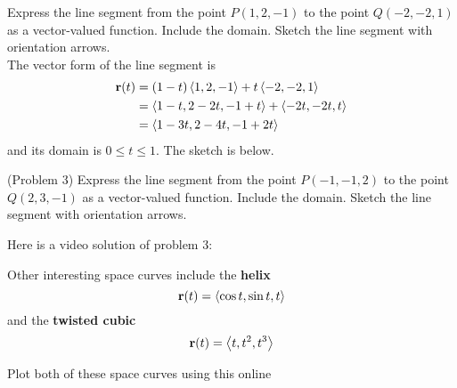 \documentclass[handout]{ximera}
\begin{document}
\begin{example}[Example 3]
Express the line segment from the point $P(1, 2, -1)$ to the point $Q(-2, -2, 1)$ as a vector-valued function.  
Include the domain. Sketch the line segment with orientation arrows.\\
The vector form of the line segment is
\begin{align*}
    \mathbf r(t) &= (1-t)\left\langle 1, 2, -1\right\rangle + t \left\langle -2, -2, 1\right\rangle\\
              &= \left\langle 1-t, 2-2t, -1+t\right\rangle + \left\langle -2t, -2t, t\right\rangle\\
              &= \left\langle 1-3t, 2-4t, -1+2t\right\rangle
\end{align*}
and its domain is $0 \leq t \leq 1$. The sketch is below.




\begin{image}
\end{image}


\end{example}



\begin{problem}(Problem 3)
Express the line segment from the point $P(-1, -1, 2)$ to the point $Q(2, 3, -1)$ as a vector-valued function.  
Include the domain. Sketch the line segment with orientation arrows.
\end{problem}

Here is a video solution of problem 3:\\
\begin{foldable}
\end{foldable}

Other interesting space curves include the \textbf{helix}
\[
\mathbf r(t) = \left\langle \cos t, \sin t, t\right\rangle
\]
and the \textbf{twisted cubic}
\[
\mathbf r(t) = \left\langle t, t^2, t^3\right\rangle
\]

Plot both of these space curves using this online 
\end{document}
